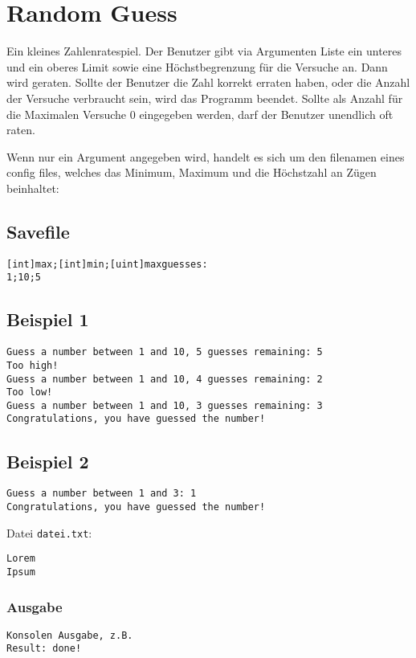 \documentclass[a4paper,10pt]{article}
\begin{document}
\section*{Random Guess}

Ein kleines Zahlenratespiel. Der Benutzer gibt via Argumenten Liste ein unteres und ein oberes Limit sowie eine Höchstbegrenzung für die Versuche an. Dann wird geraten. Sollte der Benutzer die Zahl korrekt erraten haben, oder die Anzahl der Versuche verbraucht sein, wird das Programm beendet.
Sollte als Anzahl für die Maximalen Versuche 0 eingegeben werden, darf der Benutzer unendlich oft raten.

Wenn nur ein Argument angegeben wird, handelt es sich um den filenamen eines config files,
welches das Minimum, Maximum und die Höchstzahl an Zügen beinhaltet:

\subsection*{Savefile}
\begin{verbatim}
[int]max;[int]min;[uint]maxguesses:
1;10;5
\end{verbatim}


\subsection*{Beispiel 1}
\begin{verbatim}
Guess a number between 1 and 10, 5 guesses remaining: 5
Too high!
Guess a number between 1 and 10, 4 guesses remaining: 2
Too low!
Guess a number between 1 and 10, 3 guesses remaining: 3
Congratulations, you have guessed the number!
\end{verbatim}


\subsection*{Beispiel 2}
\begin{verbatim}
Guess a number between 1 and 3: 1
Congratulations, you have guessed the number!
\end{verbatim}


Datei \texttt{datei.txt}:
\begin{lstlisting}[frame=single]
Lorem
Ipsum
\end{lstlisting}



\subsubsection*{Ausgabe}
\begin{verbatim}
Konsolen Ausgabe, z.B.
Result: done!
\end{verbatim}
\end{document}
